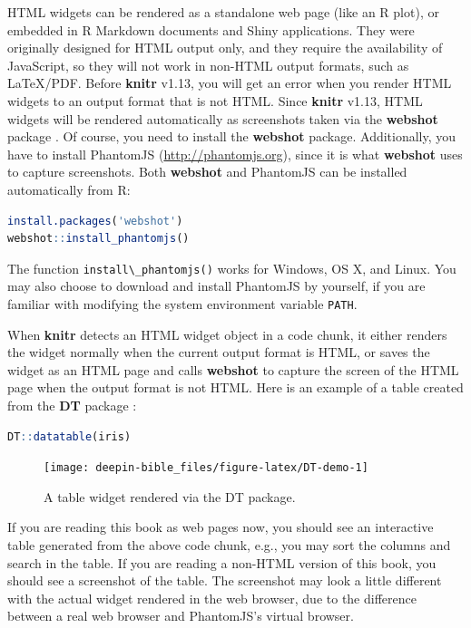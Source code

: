 \documentclass[doctor,openright,twoside]{sjtuthesis}
\newcommand{\passthrough}[1]{#1}
\theoremstyle{plain}
\theoremstyle{definition}
\theoremstyle{remark}
\theoremstyle{ocrenumbox}
\theoremstyle{plain}
\begin{document}
HTML widgets can be rendered as a standalone web page (like an R plot),
or embedded in R Markdown documents and Shiny applications. They were
originally designed for HTML output only, and they require the
availability of JavaScript, so they will not work in non-HTML output
formats, such as LaTeX/PDF. Before \textbf{knitr} v1.13, you will get an
error when you render HTML widgets to an output format that is not HTML.
Since \textbf{knitr} v1.13, HTML widgets will be rendered automatically
as screenshots taken via the \textbf{webshot} package
\autocite{R-webshot}. Of course, you need to install the
\textbf{webshot} package. Additionally, you have to install PhantomJS
(\url{http://phantomjs.org}), since it is what \textbf{webshot} uses to
capture screenshots. Both \textbf{webshot} and PhantomJS can be
installed automatically from R:

\begin{lstlisting}[language=R]
install.packages('webshot')
webshot::install_phantomjs()
\end{lstlisting}

The function \passthrough{\lstinline!install\_phantomjs()!} works for
Windows, OS X, and Linux. You may also choose to download and install
PhantomJS by yourself, if you are familiar with modifying the system
environment variable \passthrough{\lstinline!PATH!}.

When \textbf{knitr} detects an HTML widget object in a code chunk, it
either renders the widget normally when the current output format is
HTML, or saves the widget as an HTML page and calls \textbf{webshot} to
capture the screen of the HTML page when the output format is not HTML.
Here is an example of a table created from the \textbf{DT} package
\autocite{R-DT}:

\begin{lstlisting}[language=R]
DT::datatable(iris)
\end{lstlisting}

\begin{figure}
\texttt{[image: deepin-bible\_files/figure-latex/DT-demo-1]} \caption[A table widget rendered via the DT package]{A table widget rendered via the DT package.}\label{fig:DT-demo}
\end{figure}

If you are reading this book as web pages now, you should see an
interactive table generated from the above code chunk, e.g., you may
sort the columns and search in the table. If you are reading a non-HTML
version of this book, you should see a screenshot of the table. The
screenshot may look a little different with the actual widget rendered
in the web browser, due to the difference between a real web browser and
PhantomJS's virtual browser.
\end{document}
